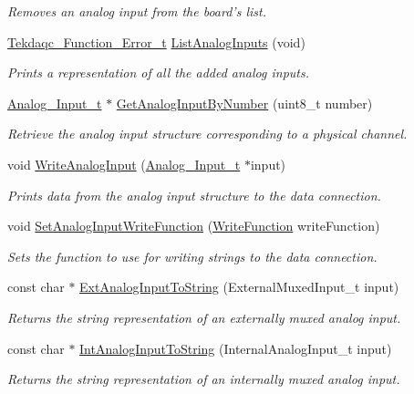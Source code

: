 \begin{DoxyCompactItemize}
\begin{DoxyCompactList}\small\item\em Removes an analog input from the board's list. \end{DoxyCompactList}\item 
\hyperlink{group__tekdaqc__error_ga19df05d919ecca7a7501b35ae9080a32}{Tekdaqc\-\_\-\-Function\-\_\-\-Error\-\_\-t} \hyperlink{group__analog__input_ga30736f8a2ceb6a1993055302893efefe}{List\-Analog\-Inputs} (void)
\begin{DoxyCompactList}\small\item\em Prints a representation of all the added analog inputs. \end{DoxyCompactList}\item 
\hyperlink{struct_analog___input__t}{Analog\-\_\-\-Input\-\_\-t} $\ast$ \hyperlink{group__analog__input_ga697505715d2411ad856bca3d1e726913}{Get\-Analog\-Input\-By\-Number} (uint8\-\_\-t number)
\begin{DoxyCompactList}\small\item\em Retrieve the analog input structure corresponding to a physical channel. \end{DoxyCompactList}\item 
void \hyperlink{group__analog__input_ga3d7d6daf5f4b4a4c455dd9b9aec6053b}{Write\-Analog\-Input} (\hyperlink{struct_analog___input__t}{Analog\-\_\-\-Input\-\_\-t} $\ast$input)
\begin{DoxyCompactList}\small\item\em Prints data from the analog input structure to the data connection. \end{DoxyCompactList}\item 
void \hyperlink{group__analog__input_ga8230666b0182b4ce633c20860b5146ff}{Set\-Analog\-Input\-Write\-Function} (\hyperlink{group__tekdaqc__configuration_ga163b2a4cc55a569e988df48908631967}{Write\-Function} write\-Function)
\begin{DoxyCompactList}\small\item\em Sets the function to use for writing strings to the data connection. \end{DoxyCompactList}\item 
const char $\ast$ \hyperlink{group__analog__input_ga87d73c733aa66effbdafe2a15b7c4a54}{Ext\-Analog\-Input\-To\-String} (External\-Muxed\-Input\-\_\-t input)
\begin{DoxyCompactList}\small\item\em Returns the string representation of an externally muxed analog input. \end{DoxyCompactList}\item 
const char $\ast$ \hyperlink{group__analog__input_gae568c96624ef9e126175706f85eec3b4}{Int\-Analog\-Input\-To\-String} (Internal\-Analog\-Input\-\_\-t input)
\begin{DoxyCompactList}\small\item\em Returns the string representation of an internally muxed analog input. \end{DoxyCompactList}\end{DoxyCompactItemize}


